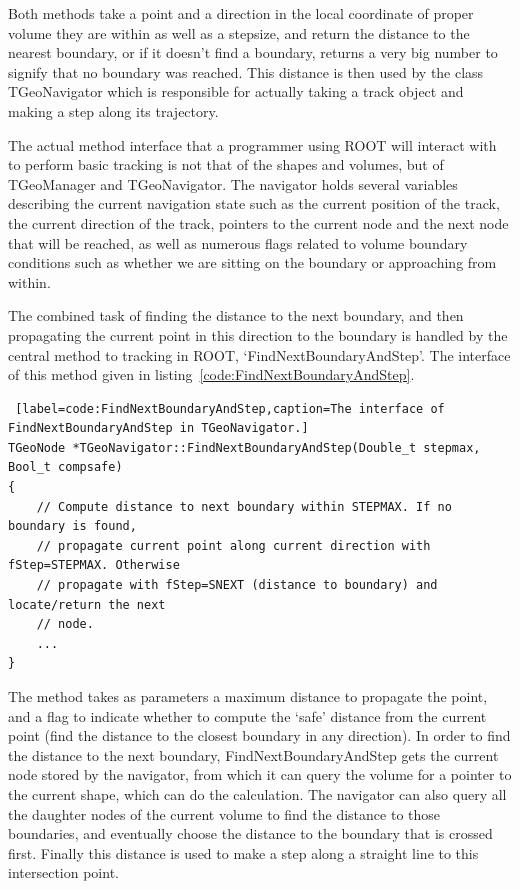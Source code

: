 \documentclass[11pt,a4paper,oneside]{article}
\begin{document}
Both methods take a point and a direction in the local coordinate of proper volume they are within as well as a stepsize, and return the distance to the nearest boundary, or if it doesn't find a boundary, returns a very big number to signify that no boundary was reached. This distance is then used by the class TGeoNavigator which is responsible for actually taking a track object and making a step along its trajectory. 

The actual method interface that a programmer using ROOT will interact with to perform basic tracking is not that of the shapes and volumes, but of TGeoManager and TGeoNavigator. The navigator holds several variables describing the current navigation state such as the current position of the track, the current direction of the track, pointers to the current node and the next node that will be reached, as well as numerous flags related to volume boundary conditions such as whether we are sitting on the boundary or approaching from within.

The combined task of finding the distance to the next boundary, and then propagating the current point in this direction to the boundary is handled by the central method to tracking in ROOT, `FindNextBoundaryAndStep'. The interface of this method given in listing~\ref{code:FindNextBoundaryAndStep}. 

\begin{sourcecode} 
\begin{lstlisting} [label=code:FindNextBoundaryAndStep,caption=The interface of FindNextBoundaryAndStep in TGeoNavigator.]
TGeoNode *TGeoNavigator::FindNextBoundaryAndStep(Double_t stepmax, Bool_t compsafe)
{
	// Compute distance to next boundary within STEPMAX. If no boundary is found,
	// propagate current point along current direction with fStep=STEPMAX. Otherwise
	// propagate with fStep=SNEXT (distance to boundary) and locate/return the next 
	// node.
	...
}
\end{lstlisting} 
\end{sourcecode}

The method takes as parameters a maximum distance to propagate the point, and a flag to indicate whether to compute the `safe' distance from the current point (find the distance to the closest boundary in any direction). In order to find the distance to the next boundary, FindNextBoundaryAndStep gets the current node stored by the navigator, from which it can query the volume for a pointer to the current shape, which can do the calculation. The navigator can also query all the daughter nodes of the current volume to find the distance to those boundaries, and eventually choose the distance to the boundary that is crossed first. Finally this distance is used to make a step along a straight line to this intersection point.  
\end{document}
